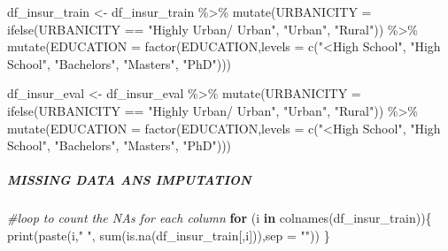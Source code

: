 \documentclass[
]{article}
\newenvironment{Shaded}{\begin{snugshade}}{\end{snugshade}}
\newcommand{\AttributeTok}[1]{\textcolor[rgb]{0.77,0.63,0.00}{#1}}
\newcommand{\CommentTok}[1]{\textcolor[rgb]{0.56,0.35,0.01}{\textit{#1}}}
\newcommand{\ControlFlowTok}[1]{\textcolor[rgb]{0.13,0.29,0.53}{\textbf{#1}}}
\newcommand{\FunctionTok}[1]{\textcolor[rgb]{0.00,0.00,0.00}{#1}}
\newcommand{\NormalTok}[1]{#1}
\newcommand{\OtherTok}[1]{\textcolor[rgb]{0.56,0.35,0.01}{#1}}
\newcommand{\SpecialCharTok}[1]{\textcolor[rgb]{0.00,0.00,0.00}{#1}}
\newcommand{\StringTok}[1]{\textcolor[rgb]{0.31,0.60,0.02}{#1}}
\begin{document}
\begin{Shaded}
\begin{Highlighting}[]
\NormalTok{df\_insur\_train }\OtherTok{\textless{}{-}}\NormalTok{ df\_insur\_train }\SpecialCharTok{\%\textgreater{}\%} 
  \FunctionTok{mutate}\NormalTok{(}\AttributeTok{URBANICITY =} \FunctionTok{ifelse}\NormalTok{(URBANICITY }\SpecialCharTok{==} \StringTok{"Highly Urban/ Urban"}\NormalTok{,}
                             \StringTok{"Urban"}\NormalTok{, }\StringTok{"Rural"}\NormalTok{)) }\SpecialCharTok{\%\textgreater{}\%} 
  \FunctionTok{mutate}\NormalTok{(}\AttributeTok{EDUCATION =} \FunctionTok{factor}\NormalTok{(EDUCATION,}\AttributeTok{levels =} \FunctionTok{c}\NormalTok{(}\StringTok{"\textless{}High School"}\NormalTok{,}
                                                 \StringTok{"High School"}\NormalTok{,}
                                                 \StringTok{"Bachelors"}\NormalTok{,}
                                                 \StringTok{"Masters"}\NormalTok{,}
                                                 \StringTok{"PhD"}\NormalTok{)))}

\NormalTok{df\_insur\_eval }\OtherTok{\textless{}{-}}\NormalTok{ df\_insur\_eval }\SpecialCharTok{\%\textgreater{}\%} 
  \FunctionTok{mutate}\NormalTok{(}\AttributeTok{URBANICITY =} \FunctionTok{ifelse}\NormalTok{(URBANICITY }\SpecialCharTok{==} \StringTok{"Highly Urban/ Urban"}\NormalTok{,}
                             \StringTok{"Urban"}\NormalTok{, }\StringTok{"Rural"}\NormalTok{)) }\SpecialCharTok{\%\textgreater{}\%} 
  \FunctionTok{mutate}\NormalTok{(}\AttributeTok{EDUCATION =} \FunctionTok{factor}\NormalTok{(EDUCATION,}\AttributeTok{levels =} \FunctionTok{c}\NormalTok{(}\StringTok{"\textless{}High School"}\NormalTok{,}
                                                 \StringTok{"High School"}\NormalTok{,}
                                                 \StringTok{"Bachelors"}\NormalTok{,}
                                                 \StringTok{"Masters"}\NormalTok{,}
                                                 \StringTok{"PhD"}\NormalTok{)))}
\end{Highlighting}
\end{Shaded}

\hypertarget{missing-data-ans-imputation}{%
\subparagraph{MISSING DATA ANS
IMPUTATION}\label{missing-data-ans-imputation}}

\begin{Shaded}
\begin{Highlighting}[]
\CommentTok{\#loop to count the NAs for each column}
\ControlFlowTok{for}\NormalTok{ (i }\ControlFlowTok{in} \FunctionTok{colnames}\NormalTok{(df\_insur\_train))\{}
  \FunctionTok{print}\NormalTok{(}\FunctionTok{paste}\NormalTok{(i,}\StringTok{"  "}\NormalTok{, }\FunctionTok{sum}\NormalTok{(}\FunctionTok{is.na}\NormalTok{(df\_insur\_train[,i])),}\AttributeTok{sep =} \StringTok{""}\NormalTok{))}
\NormalTok{\}}
\end{Highlighting}
\end{Shaded}
\end{document}
